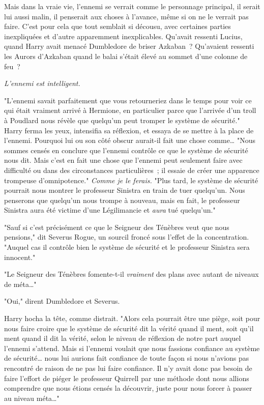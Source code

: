 Mais dans la vraie vie, l'ennemi se verrait comme le personnage principal, il serait lui aussi malin, il penserait aux choses à l'avance, même si on ne le verrait pas faire. C'est pour cela que tout semblait si décousu, avec certaines parties inexpliquées et d'autre apparemment inexplicables. Qu'avait ressenti Lucius, quand Harry avait menacé Dumbledore de briser Azkaban~? Qu'avaient ressenti les Aurors d'Azkaban quand le balai s'était élevé au sommet d'une colonne de feu~?

\emph{L'ennemi est intelligent.}

"L'ennemi savait parfaitement que vous retourneriez dans le temps pour voir ce qui était vraiment arrivé à Hermione, en particulier parce que l'arrivée d'un troll à Poudlard nous révèle que quelqu'un peut tromper le système de sécurité." Harry ferma les yeux, intensifia sa réflexion, et essaya de se mettre à la place de l'ennemi. Pourquoi lui ou son côté obscur aurait-il fait une chose comme… "Nous sommes censés en conclure que l'ennemi contrôle ce que le système de sécurité nous dit. Mais c'est en fait une chose que l'ennemi peut seulement faire avec difficulté ou dans des circonstances particulières~; il essaie de créer une apparence trompeuse d'omnipotence." \emph{Comme je le ferais.} "Plus tard, le système de sécurité pourrait nous montrer le professeur Sinistra en train de tuer quelqu'un. Nous penserons que quelqu'un nous trompe à nouveau, mais en fait, le professeur Sinistra aura été victime d'une Légilimancie et \emph{aura} tué quelqu'un."

"Sauf si c'est précisément ce que le Seigneur des Ténèbres veut que nous pensions," dit Severus Rogue, un sourcil froncé sous l'effet de la concentration. "Auquel cas il contrôle bien le système de sécurité et le professeur Sinistra sera innocent."

"Le Seigneur des Ténèbres fomente-t-il \emph{vraiment} des plans avec autant de niveaux de méta…"

"Oui," dirent Dumbledore et Severus.

Harry hocha la tête, comme distrait. "Alors cela pourrait être une piège, soit pour nous faire croire que le système de sécurité dit la vérité quand il ment, soit qu'il ment quand il dit la vérité, selon le niveau de réflexion de notre part auquel l'ennemi s'attend. Mais si l'ennemi voulait que nous fassions confiance au système de sécurité… nous lui aurions fait confiance de toute façon si nous n'avions pas rencontré de raison de ne pas lui faire confiance. Il n'y avait donc pas besoin de faire l'effort de piéger le professeur Quirrell par une méthode dont nous allions comprendre que nous étions censés la découvrir, juste pour nous forcer à passer au niveau méta…"

